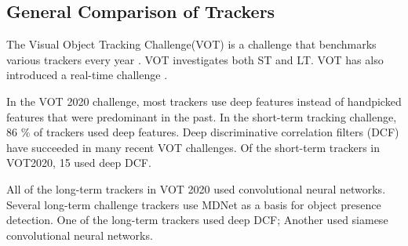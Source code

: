 \subsection{General Comparison of Trackers}
  The Visual Object Tracking Challenge(VOT) is a challenge that benchmarks various trackers every year \cite{VOT2017, VOT2020}.
  VOT investigates both ST and LT.
  VOT has also introduced a real-time challenge \cite{VOT2020}.

  In the VOT 2020 challenge, most trackers use deep features instead of handpicked features that were predominant in the past.
  In the short-term tracking challenge, 86 \% of trackers used deep features.
  Deep discriminative correlation filters (DCF) \cite{danelljan2019} have succeeded in many recent VOT challenges. 
  Of the short-term trackers in VOT2020, 15 used deep DCF.

  All of the long-term trackers in VOT 2020 used convolutional neural networks.
  Several long-term challenge trackers use MDNet \cite{CNNTracking} as a basis for object presence detection.
  One of the long-term trackers used deep DCF; Another used siamese convolutional neural networks.
